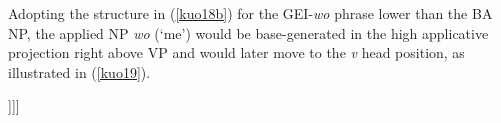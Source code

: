 \documentclass[output=paper,colorlinks,citecolor=brown]{langscibook}
\begin{document}
\ea
\label{kuo18}
    \z
\z

Adopting the structure in (\ref{kuo18b}) for the GEI-\textit{wo} phrase lower than the BA NP, the applied NP \textit{wo} (`me') would be base-generated in the high applicative projection right above VP and would later move to the \textit{v} head position, as illustrated in (\ref{kuo19}).

\ea
\label{kuo19}
\glt [\textsubscript{TP} ..... [\textsubscript{\textit{v}P}   gei\textsubscript{i}  [\textsubscript{ApplHP}  wo    t\textsubscript{i}   [\textsubscript{VP} .....]]]]\\  
\z
\end{document}
